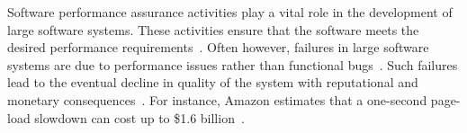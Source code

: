 




Software performance assurance activities play a vital role in the development of large software systems. These activities ensure that the software meets the desired performance requirements~\cite{futureofspe}. Often however, failures in large software systems are due to performance issues rather than functional bugs~\cite{tailatscale, foo2010mining}. Such failures lead to the eventual decline in quality of the system with reputational and monetary consequences~\cite{costofdowntime}. For instance, Amazon estimates that a one-second page-load slowdown can cost up to \$1.6 billion~\cite{amazononesec}. 

